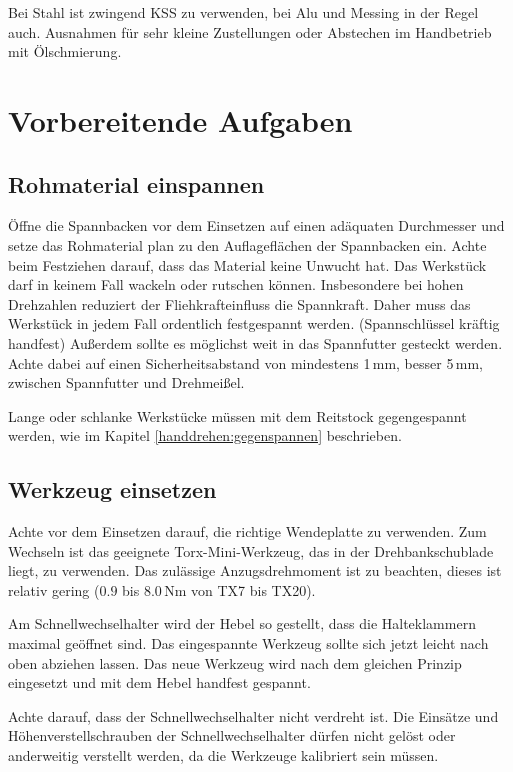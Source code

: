 \documentclass{\basedir/fablab-document}
\begin{document}
Bei Stahl ist zwingend KSS zu verwenden, bei Alu und Messing in der Regel auch. Ausnahmen für sehr kleine Zustellungen oder Abstechen im Handbetrieb mit Ölschmierung.



\section{Vorbereitende Aufgaben}
\subsection{Rohmaterial einspannen}

Öffne die Spannbacken vor dem Einsetzen auf einen adäquaten Durchmesser und setze das Rohmaterial
plan zu den Auflageflächen der Spannbacken ein.
Achte beim Festziehen darauf, dass das Material keine Unwucht hat.
Das Werkstück darf in keinem Fall wackeln oder rutschen können. 
Insbesondere bei hohen Drehzahlen reduziert der Fliehkrafteinfluss die Spannkraft.
Daher muss das Werkstück in jedem Fall ordentlich festgespannt werden. (Spannschlüssel kräftig handfest)
Außerdem sollte es möglichst weit in das Spannfutter gesteckt werden.
Achte dabei auf einen Sicherheitsabstand von mindestens 1\,mm, besser 5\,mm, zwischen Spannfutter und Drehmeißel.

Lange oder schlanke Werkstücke müssen mit dem Reitstock gegengespannt werden,
wie im Kapitel \ref{handdrehen:gegenspannen} beschrieben.

\subsection{Werkzeug einsetzen} %
Achte vor dem Einsetzen darauf, die richtige Wendeplatte zu verwenden. Zum Wechseln ist das geeignete Torx-Mini-Werkzeug, das in der Drehbankschublade liegt, zu verwenden. Das zulässige Anzugsdrehmoment ist zu beachten, dieses ist relativ gering ($0.9$ bis $8.0$\,Nm von TX7 bis TX20).

Am Schnellwechselhalter wird der Hebel so gestellt, dass die Halteklammern maximal geöffnet sind.
Das eingespannte Werkzeug sollte sich jetzt leicht nach oben abziehen lassen.
Das neue Werkzeug wird nach dem gleichen Prinzip eingesetzt und mit dem Hebel handfest gespannt.

Achte darauf, dass der Schnellwechselhalter nicht verdreht ist. Die Einsätze und Höhenverstellschrauben der Schnellwechselhalter dürfen nicht gelöst oder anderweitig verstellt werden, da die Werkzeuge kalibriert sein müssen.
\end{document}
